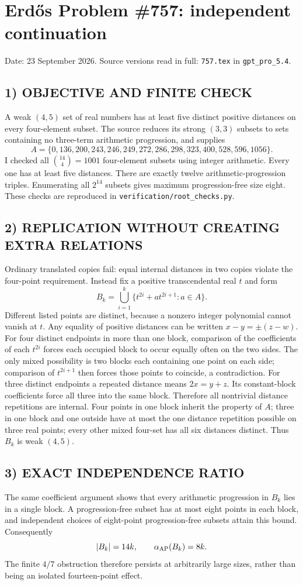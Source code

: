 \section{Erd\H{o}s Problem \#757: independent continuation}
\noindent Date: 23 September 2026. Source versions read in full: \texttt{757.tex} in \texttt{gpt\_pro\_5.4}.

\subsection*{1) OBJECTIVE AND FINITE CHECK}
A weak $(4,5)$ set of real numbers has at least five distinct positive distances on every four-element subset. The source reduces its strong $(3,3)$ subsets to sets containing no three-term arithmetic progression, and supplies
\[
A=\{0,136,200,243,246,249,272,286,298,323,400,528,596,1056\}.
\]
I checked all $\binom{14}{4}=1001$ four-element subsets using integer arithmetic. Every one has at least five distances. There are exactly twelve arithmetic-progression triples. Enumerating all $2^{14}$ subsets gives maximum progression-free size eight. These checks are reproduced in \texttt{verification/root\_checks.py}.
\subsection*{2) REPLICATION WITHOUT CREATING EXTRA RELATIONS}
Ordinary translated copies fail: equal internal distances in two copies violate the four-point requirement. Instead fix a positive transcendental real $t$ and form
\[
B_k=\bigcup_{i=1}^k\{t^{2i}+a t^{2i+1}:a\in A\}.
\]
Different listed points are distinct, because a nonzero integer polynomial cannot vanish at $t$.
Any equality of positive distances can be written $x-y=\pm(z-w)$. For four distinct endpoints in more than one block, comparison of the coefficients of each $t^{2i}$ forces each occupied block to occur equally often on the two sides. The only mixed possibility is two blocks each containing one point on each side; comparison of $t^{2i+1}$ then forces those points to coincide, a contradiction. For three distinct endpoints a repeated distance means $2x=y+z$. Its constant-block coefficients force all three into the same block.
Therefore all nontrivial distance repetitions are internal. Four points in one block inherit the property of $A$; three in one block and one outside have at most the one distance repetition possible on three real points; every other mixed four-set has all six distances distinct. Thus $B_k$ is weak $(4,5)$.
\subsection*{3) EXACT INDEPENDENCE RATIO}
The same coefficient argument shows that every arithmetic progression in $B_k$ lies in a single block. A progression-free subset has at most eight points in each block, and independent choices of eight-point progression-free subsets attain this bound. Consequently
\[
|B_k|=14k,\qquad \alpha_{\rm AP}(B_k)=8k.
\]
The finite $4/7$ obstruction therefore persists at arbitrarily large sizes, rather than being an isolated fourteen-point effect.
